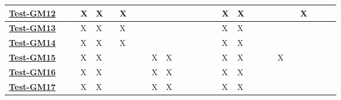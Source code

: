 \documentclass[12pt, titlepage]{article}
\begin{document}
\begin{landscape}
\begin{table}[H]
\begin{adjustwidth}{-0.0in}{-1in}
{\begin{tabular}{l|l|l|l|l|l|l|l|l|l|l|l|l|l|l|l|l|l|l|l|l|l|l|l|l|l|l|}
\multicolumn{1}{|l|}{\hyperref[Test-GM12]{\textbf{Test-GM12}}}&              &              & X            & X            &              & X            &              &              &              &               &               &               &               &               &               & X             & X             &               &               &               &               &               & X           &             &             &             \\ \hline
\multicolumn{1}{|l|}{\hyperref[Test-GM13]{\textbf{Test-GM13}}} &              &              & X            & X            &              & X            &              &              &              &               &               &               &               &               &               & X             & X             &               &               &               &               &               &             &             &             &             \\ \hline
\multicolumn{1}{|l|}{\hyperref[Test-GM14]{\textbf{Test-GM14}}} &              &              & X            & X            &              & X            &              &              &              &               &               &               &               &               &               & X             & X             &               &               &               &               &               &             &             &             &             \\ \hline
\multicolumn{1}{|l|}{\hyperref[Test-GM15]{\textbf{Test-GM15}}}&              &              & X            & X            &              &              &              &              & X            & X             &               &               &               &               &               & X             & X             &               &               &               & X             &               &             &             &             &             \\ \hline
\multicolumn{1}{|l|}{\hyperref[Test-GM16]{\textbf{Test-GM16}}} &              &              & X            & X            &              &              &              &              & X            & X             &               &               &               &               &               & X             & X             &               &               &               &               &               &             &             &             &             \\ \hline
\multicolumn{1}{|l|}{\hyperref[Test-GM17]{\textbf{Test-GM17}}}&              &              & X            & X            &              &              &              &              & X            & X             &               &               &               &               &               & X             & X             &               &               &               &               &               &             &             &             &             \\ \hline

\end{tabular}}
\end{adjustwidth}
\end{table}
\end{landscape}
\end{document}
